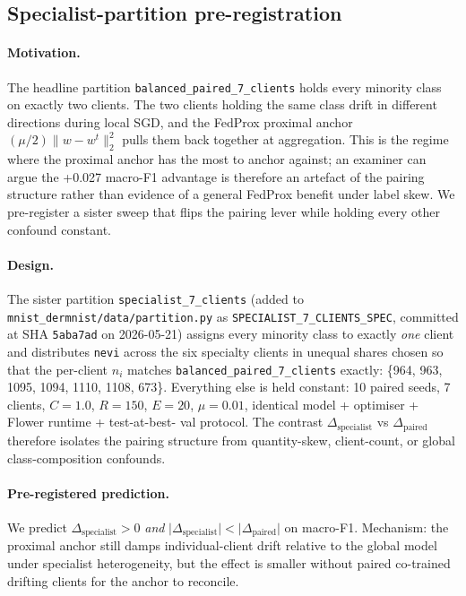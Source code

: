\documentclass[11pt,a4paper]{article}
\begin{document}
\subsection{Specialist-partition pre-registration}\label{sec:hyp-specialist}
\paragraph{Motivation.}
The headline partition \texttt{balanced\_paired\_7\_clients} holds every
minority class on exactly two clients. The two clients holding the same
class drift in different directions during local SGD, and the FedProx
proximal anchor $(\mu/2)\lVert w - w^t\rVert_2^2$ pulls them back together
at aggregation. This is the regime where the proximal anchor has the
most to anchor against; an examiner can argue the +0.027 macro-F1
advantage is therefore an artefact of the pairing structure rather than
evidence of a general FedProx benefit under label skew. We pre-register
a sister sweep that flips the pairing lever while holding every other
confound constant.

\paragraph{Design.}
The sister partition \texttt{specialist\_7\_clients} (added to
\texttt{mnist\_dermnist/data/partition.py} as
\texttt{SPECIALIST\_7\_CLIENTS\_SPEC}, committed at SHA \texttt{5aba7ad} on
2026-05-21) assigns every minority class to exactly \emph{one} client and
distributes \texttt{nevi} across the six specialty clients in unequal
shares chosen so that the per-client $n_i$ matches
\texttt{balanced\_paired\_7\_clients} exactly:
\{964, 963, 1095, 1094, 1110, 1108, 673\}. Everything else is held
constant: 10 paired seeds, 7 clients, $C=1.0$, $R=150$, $E=20$,
$\mu=0.01$, identical model + optimiser + Flower runtime + test-at-best-
val protocol. The contrast $\Delta_{\mathrm{specialist}}$ vs
$\Delta_{\mathrm{paired}}$ therefore isolates the pairing structure from
quantity-skew, client-count, or global class-composition confounds.

\paragraph{Pre-registered prediction.}
We predict $\Delta_{\mathrm{specialist}} > 0$ \emph{and}
$\lvert\Delta_{\mathrm{specialist}}\rvert < \lvert\Delta_{\mathrm{paired}}\rvert$
on macro-F1. Mechanism: the proximal anchor still damps individual-client
drift relative to the global model under specialist heterogeneity, but
the effect is smaller without paired co-trained drifting clients for the
anchor to reconcile.
\end{document}
